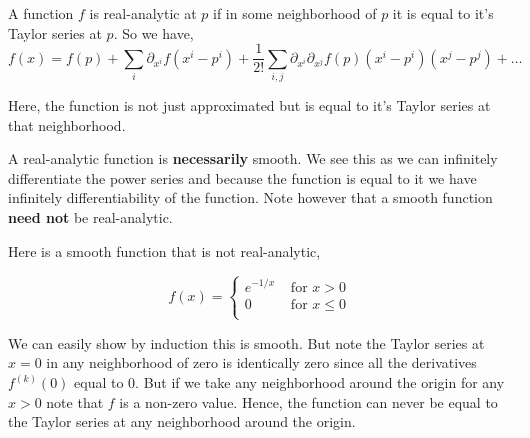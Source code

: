 \begin{definition}
  A function $f$ is real-analytic at $p$ if in some neighborhood of $p$ it is equal to it's Taylor series at $p$. So we have, 
  \[
    f(x) = f(p) + \sum_i \partial_{x^{i}} f(x^{i} - p^{i}) + \frac{1}{2!} \sum_{i, j} \partial_{x^{i}} \partial_{x^{j}} f(p) (x^{i} - p^{i})(x^{j} - p^{j}) + \dots
  \]
\end{definition}
\begin{note}
  Here, the function is not just approximated but is equal to it's Taylor series at that neighborhood.
\end{note}
\begin{remark}
  A real-analytic function is \textbf{necessarily} smooth. We see this as we can infinitely differentiate the power series and because the function is equal to it we have infinitely differentiability of the function. Note however that a smooth function \textbf{need not} be real-analytic.
\end{remark}
\begin{eg}
  Here is a smooth function that is not real-analytic,
  
  \[
    f(x) = \begin{cases}
      e^{-1 / x}  &\text{ for } x > 0\\
      0 &\text{ for } x \le 0\\
    \end{cases}
  \]

  We can easily show by induction this is smooth. But note the Taylor series at $x = 0$ in any neighborhood of zero is identically zero since all the derivatives $f^{(k)}(0)$ equal to $0$. But if we take any neighborhood around the origin for any $x > 0$ note that $f$ is a non-zero value. Hence, the function can never be equal to the Taylor series at any neighborhood around the origin.
\end{eg}

